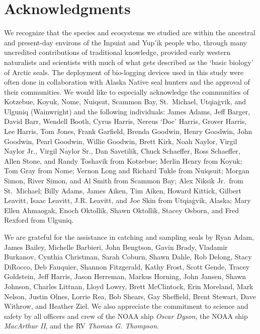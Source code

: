 \documentclass[fleqn,10pt,lineno]{wlpeerj} %
\begin{document}
\section*{Acknowledgments}\label{acknowledgments}

We recognize that the species and ecosystems we studied are within the ancestral
and present-day environs of the Inpuiat and Yup'ik people who, through many
uncredited contributions of traditional knowledge, provided early western
naturalists and scientists with much of what gets described as the `basic
biology' of Arctic seals. The deployment of bio-logging devices used in this
study were often done in collaboration with Alaska Native seal hunters and the
approval of
their communities. We would like to especially acknowledge the communities of
Kotzebue, Koyuk, Nome, Nuiqsut, Scammon Bay, St.~Michael, Utqiaġvik, and Ulguniq
(Wainwright) and the following individuals: James Adams, Jeff Barger, David
Barr, Wendell Booth, Cyrus Harris, Nereus `Doc' Harris, Grover Harris, Lee
Harris, Tom Jones, Frank Garfield, Brenda Goodwin, Henry Goodwin, John Goodwin,
Pearl Goodwin, Willie Goodwin, Brett Kirk, Noah Naylor, Virgil Naylor Jr.,
Virgil Naylor Sr., Dan Savetilik, Chuck Schaeffer, Ross Schaeffer, Allen Stone,
and Randy Toshavik from Kotzebue; Merlin Henry from Koyuk; Tom
Gray from Nome; Vernon Long and Richard Tukle from Nuiqsuit; Morgan
Simon, River Simon, and Al Smith from Scammon Bay; Alex Niksik Jr.~from
St.~Michael; Billy Adams, James Aiken, Tim Aiken, Howard Kittick,
Gilbert Leavitt, Isaac Leavitt, J.R. Leavitt, and Joe Skin from Utqiaġvik,
Alaska; Mary Ellen Ahmaogak, Enoch Oktollik, Shawn Oktollik, Stacey Osborn, and
Fred Rexford from Ulguniq.

We are grateful for the assistance in catching and sampling seals by Ryan Adam,
James Bailey, Michelle Barbieri, John Bengtson, Gavin Brady, Vladamir Burkanov,
Cynthia Christman, Sarah Coburn, Shawn Dahle, Rob Delong, Stacy DiRocco, Deb
Fauquier, Shannon Fitzgerald, Kathy Frost, Scott Gende, Tracey Goldstein, Jeff
Harris, Jason Herreman, Markus Horning, John Jansen, Shawn Johnson, Charles
Littnan, Lloyd Lowry, Brett McClintock, Erin Moreland, Mark Nelson, Justin
Olnes, Lorrie Rea, Bob Shears, Gay Sheffield, Brent Stewart, Dave Withrow, and
Heather Ziel. We also appreciate the commitment to science and safety by all
officers and crew of the NOAA ship \emph{Oscar Dyson}, the NOAA ship \emph{MacArthur II}, and
the RV \emph{Thomas G. Thompson}.
\end{document}
